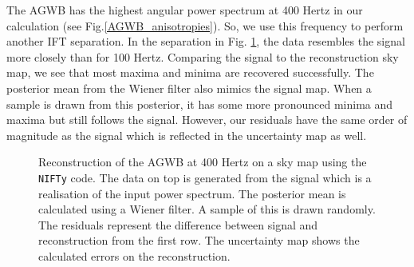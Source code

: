The AGWB has the highest angular power spectrum at 400 Hertz in our calculation (see Fig.\ref{AGWB_anisotropies}). So, we use this frequency to perform another IFT separation. In the separation in Fig. \ref{sky_maps_400}, the data resembles the signal more closely than for 100 Hertz. Comparing the signal to the reconstruction sky map, we see that most maxima and minima are recovered successfully. The posterior mean from the Wiener filter also mimics the signal map. When a sample is drawn from this posterior, it has some more pronounced minima and maxima but still follows the signal. However, our residuals have the same order of magnitude as the signal which is reflected in the uncertainty map as well.

\begin{figure}[h]
    \centering
    \newline
    \vspace{-1.5cm}
    \caption[Reconstruction of the AGWB at 400 Hertz on a sky map using the {\tt NIFTy} code.]{Reconstruction of the AGWB at 400 Hertz on a sky map using the {\tt NIFTy} code. The data on top is generated from the signal which is a realisation of the input power spectrum. The posterior mean is calculated using a Wiener filter. A sample of this is drawn randomly. The residuals represent the difference between signal and reconstruction from the first row. The uncertainty map shows the calculated errors on the reconstruction.}
    \label{sky_maps_400}
\end{figure}

